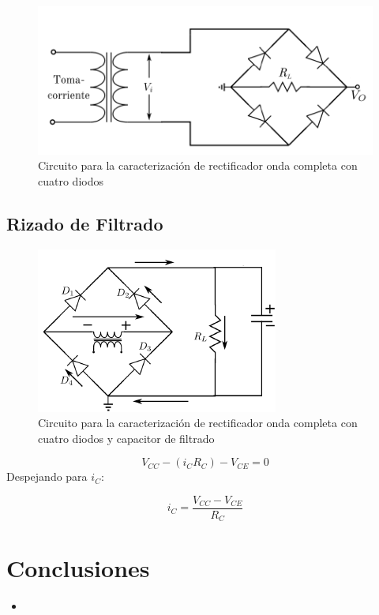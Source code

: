 \documentclass[10pt,letterpaper]{article}
\begin{document}
\begin{figure}[H]
	\centering
	\includegraphics[scale=1]{OndaCompleta4.png}
	\caption{Circuito para la caracterización de rectificador onda completa con cuatro diodos}
	\label{fig:enter-label}
\end{figure}



\subsection{Rizado de Filtrado}

\begin{figure}[h!]
	\centering
	\includegraphics[scale=1]{OndaCapacitorFiltrado.png}
	\caption{Circuito para la caracterización de rectificador onda completa con cuatro diodos y capacitor de filtrado}
	\label{fig:enter-label}
\end{figure}



\begin{equation}
	V_{CC}-(i_CR_{C})-V_{CE}=0
\end{equation}
Despejando para $i_C$:

\begin{equation}
	i_C=\frac{ V_{CC}-V_{CE}}{R_{C}}
\end{equation}




\section{Conclusiones}
\begin{itemize}
	\item








\end{itemize}

\begin{thebibliography}{9}

\end{thebibliography}
\end{document}
